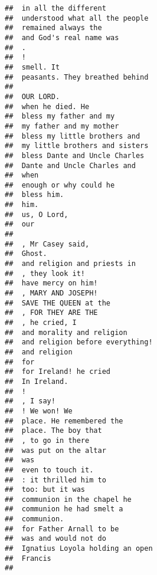 \documentclass[]{article}
\begin{document}
\begin{verbatim}
##  in all the different                    
##  understood what all the people          
##  remained always the                     
##  and God's real name was                 
##  .                                       
##  !                                       
##  smell. It                               
##  peasants. They breathed behind          
##                                          
##  OUR LORD.                               
##  when he died. He                        
##  bless my father and my                  
##  my father and my mother                 
##  bless my little brothers and            
##  my little brothers and sisters          
##  bless Dante and Uncle Charles           
##  Dante and Uncle Charles and             
##  when                                    
##  enough or why could he                  
##  bless him.                              
##  him.                                    
##  us, O Lord,                             
##  our                                     
##                                          
##  , Mr Casey said,                        
##  Ghost.                                  
##  and religion and priests in             
##  , they look it!                         
##  have mercy on him!                      
##  , MARY AND JOSEPH!                      
##  SAVE THE QUEEN at the                   
##  , FOR THEY ARE THE                      
##  , he cried, I                           
##  and morality and religion               
##  and religion before everything!         
##  and religion                            
##  for                                     
##  for Ireland! he cried                   
##  In Ireland.                             
##  !                                       
##  , I say!                                
##  ! We won! We                            
##  place. He remembered the                
##  place. The boy that                     
##  , to go in there                        
##  was put on the altar                    
##  was                                     
##  even to touch it.                       
##  : it thrilled him to                    
##  too: but it was                         
##  communion in the chapel he              
##  communion he had smelt a                
##  communion.                              
##  for Father Arnall to be                 
##  was and would not do                    
##  Ignatius Loyola holding an open         
##  Francis                                 
##                                          

\end{verbatim}
\end{document}
